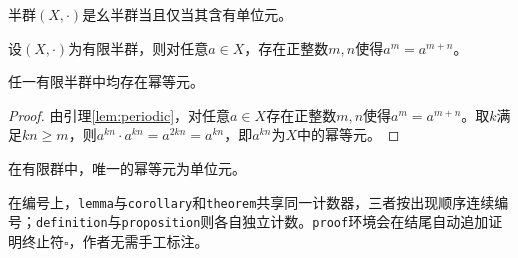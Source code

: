 \begin{proposition}
    半群$(X,\cdot)$是幺半群当且仅当其含有单位元。
\end{proposition}

\begin{lemma}
    \label{lem:periodic}
    设$(X,\cdot)$为有限半群，则对任意$a\in X$，存在正整数$m,n$使得$a^m=a^{m+n}$。
\end{lemma}

\begin{theorem}
    \label{thm:idempotent}
    任一有限半群中均存在幂等元。
\end{theorem}

\begin{proof}
    由引理\ref{lem:periodic}，对任意$a\in X$存在正整数$m,n$使得$a^m=a^{m+n}$。取$k$满足$kn\geq m$，则$a^{kn}\cdot a^{kn}=a^{2kn}=a^{kn}$，即$a^{kn}$为$X$中的幂等元。
\end{proof}

\begin{corollary}
    在有限群中，唯一的幂等元为单位元。
\end{corollary}

在编号上，\verb|lemma|与\verb|corollary|和\verb|theorem|共享同一计数器，三者按出现顺序连续编号；\verb|definition|与\verb|proposition|则各自独立计数。\verb|proof|环境会在结尾自动追加证明终止符$\square$，作者无需手工标注。
